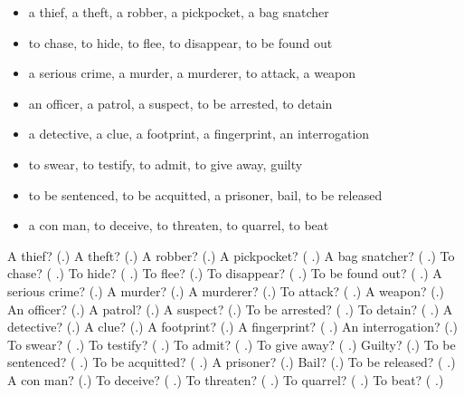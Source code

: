 \begin{itemize}
\raggedright
  \item a thief, a theft, a robber, a pickpocket, a bag snatcher
  \item to chase, to hide, to flee, to disappear, to be found out
  \item a serious crime, a murder, a murderer, to attack, a weapon
  \item an officer, a patrol, a suspect, to be arrested, to detain
  \item a detective, a clue, a footprint, a fingerprint, an interrogation
  \item to swear, to testify, to admit, to give away, guilty
  \item to be sentenced, to be acquitted, a prisoner, bail, to be released
  \item a con man, to deceive, to threaten, to quarrel, to beat
\end{itemize}

\begin{tcolorbox}[breakable,colback=teal!4,colframe=teal!35!black,title={Before you move on}]
A thief? (\textbf{}.) A theft? (\textbf{}.) A robber? (\textbf{}.) A pickpocket? (\textbf{ }.) A bag snatcher? (\textbf{ }.) To chase? (\textbf{ }.) To hide? (\textbf{ }.) To flee? (\textbf{}.) To disappear? (\textbf{ }.) To be found out? (\textbf{ }.) A serious crime? (\textbf{}.) A murder? (\textbf{}.) A murderer? (\textbf{}.) To attack? (\textbf{ }.) A weapon? (\textbf{}.) An officer? (\textbf{}.) A patrol? (\textbf{}.) A suspect? (\textbf{}.) To be arrested? (\textbf{ }.) To detain? (\textbf{ }.) A detective? (\textbf{}.) A clue? (\textbf{}.) A footprint? (\textbf{}.) A fingerprint? (\textbf{ }.) An interrogation? (\textbf{}.) To swear? (\textbf{ }.) To testify? (\textbf{ }.) To admit? (\textbf{ }.) To give away? (\textbf{ }.) Guilty? (\textbf{}.) To be sentenced? (\textbf{ }.) To be acquitted? (\textbf{ }.) A prisoner? (\textbf{}.) Bail? (\textbf{}.) To be released? (\textbf{ }.) A con man? (\textbf{}.) To deceive? (\textbf{ }.) To threaten? (\textbf{ }.) To quarrel? (\textbf{ }.) To beat? (\textbf{ }.)
\end{tcolorbox}
